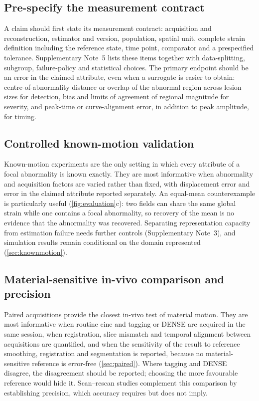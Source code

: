 \subsection{Pre-specify the measurement contract}

A claim should first state its measurement contract: acquisition and reconstruction, estimator and version, population, spatial unit, complete strain definition including the reference state, time point, comparator and a prespecified tolerance. Supplementary Note~5 lists these items together with data-splitting, subgroup, failure-policy and statistical choices. The primary endpoint should be an error in the claimed attribute, even when a surrogate is easier to obtain: centre-of-abnormality distance or overlap of the abnormal region across lesion sizes for detection, bias and limits of agreement of regional magnitude for severity, and peak-time or curve-alignment error, in addition to peak amplitude, for timing.

\subsection{Controlled known-motion validation}

Known-motion experiments are the only setting in which every attribute of a focal abnormality is known exactly. They are most informative when abnormality and acquisition factors are varied rather than fixed, with displacement error and error in the claimed attribute reported separately. An equal-mean counterexample is particularly useful (\cref{fig:evaluation}c): two fields can share the same global strain while one contains a focal abnormality, so recovery of the mean is no evidence that the abnormality was recovered. Separating representation capacity from estimation failure needs further controls (Supplementary Note~3), and simulation results remain conditional on the domain represented (\cref{sec:knownmotion}).

\subsection{Material-sensitive in-vivo comparison and precision}

Paired acquisitions provide the closest in-vivo test of material motion. They are most informative when routine cine and tagging or DENSE are acquired in the same session, when registration, slice mismatch and temporal alignment between acquisitions are quantified, and when the sensitivity of the result to reference smoothing, registration and segmentation is reported, because no material-sensitive reference is error-free (\cref{sec:paired}). Where tagging and DENSE disagree, the disagreement should be reported; choosing the more favourable reference would hide it. Scan--rescan studies complement this comparison by establishing precision, which accuracy requires but does not imply.

